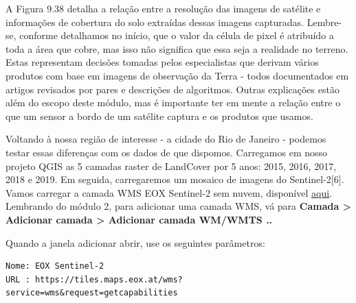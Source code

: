 \documentclass[
]{krantz}
\begin{document}
A Figura 9.38 detalha a relação entre a resolução das imagens de satélite e informações de cobertura do solo extraídas dessas imagens capturadas. Lembre-se, conforme detalhamos no início, que o valor da célula de pixel é atribuído a toda a área que cobre, mas isso não significa que essa seja a realidade no terreno. Estas representam decisões tomadas pelos especialistas que derivam vários produtos com base em imagens de observação da Terra - todos documentados em artigos revisados \hspace{0pt}\hspace{0pt}por pares e descrições de algoritmos. Outras explicações estão além do escopo deste módulo, mas é importante ter em mente a relação entre o que um sensor a bordo de um satélite captura e os produtos que usamos.

Voltando à nossa região de interesse - a cidade do Rio de Janeiro - podemos testar essas diferenças com os dados de que dispomos. Carregamos em nosso projeto QGIS as 5 camadas raster de LandCover por 5 anos: 2015, 2016, 2017, 2018 e 2019. Em seguida, carregaremos um mosaico de imagens do Sentinel-2{[}6{]}. Vamos carregar a camada WMS EOX Sentinel-2 sem nuvem, disponível \href{https://s2maps.eu/}{aqui}. Lembrando do módulo 2, para adicionar uma camada WMS, vá para \textbf{Camada \textgreater{} Adicionar camada \textgreater{} Adicionar camada WM/WMTS ..}

Quando a janela adicionar abrir, use os seguintes parâmetros:

\begin{verbatim}
Nome: EOX Sentinel-2
URL : https://tiles.maps.eox.at/wms?service=wms&request=getcapabilities
\end{verbatim}
\end{document}
